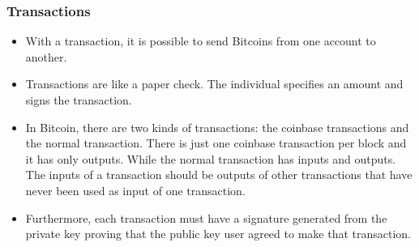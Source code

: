 \documentclass{beamer}
\begin{document}
\begin{frame}
   \frametitle{Transactions}
   \begin{itemize}
     \item With a transaction, it is possible to send Bitcoins from one account to another.
     \item Transactions are like a paper check. The individual specifies an amount and signs the transaction.
     \item In Bitcoin, there are two kinds of transactions:
       the coinbase transactions and the normal transaction.
       There is just one coinbase transaction per block and it has only outputs.
       While the normal transaction has inputs and outputs.
       The inputs of a transaction should be outputs of other transactions that have never been used as input of one transaction.
    \item Furthermore, each transaction must have a signature generated from the private key proving that the public key user agreed to make that transaction.
   \end{itemize}
\end{frame}
\end{document}

